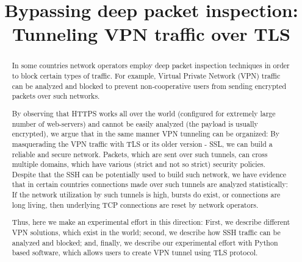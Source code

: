 \documentclass[conference,10pt,letter]{IEEEtran}
\begin{document}
\sloppy
\title{Bypassing deep packet inspection: Tunneling VPN traffic over TLS}
\maketitle
\begin{abstract}

In some countries network operators employ deep packet inspection techniques 
in order to block certain types of traffic. For example, Virtual Private Network 
(VPN) traffic can be analyzed and blocked to prevent non-cooperative users from 
sending encrypted packets over such networks. 

By observing that HTTPS works all over the world (configured for extremely large
number of web-servers) and cannot be easily analyzed (the payload is usually encrypted),
we argue that in the same manner VPN tunneling can be organized: By masquerading 
the VPN traffic with TLS or its older version - SSL, we can build a reliable and 
secure network. Packets, which are sent over such tunnels, can cross multiple
domains, which have various (strict and not so strict) security policies. 
Despite that the SSH can be potentially used to build such network, 
we have evidence that in certain countries connections
made over such tunnels are analyzed statistically: If the network utilization by 
such tunnels is high, bursts do exist, or connections are long living, then 
underlying TCP connections are reset by network operators. 

Thus, here we make an experimental effort in this direction: 
First, we describe different VPN solutions, which exist in the world;
second, we describe how SSH traffic can be analyzed and blocked; and,
finally, we describe our experimental effort with Python based software,
which allows users to create VPN tunnel using TLS protocol. 

\end{abstract}







\end{document}
